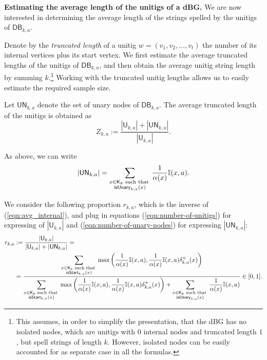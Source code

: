 \documentclass[a4paper,11pt]{article}
\newcommand{\DB}{\mathsf{DB}_{k,a}}
\newcommand{\U}{\mathsf{U}_{k,a}}
\newcommand{\UN}{\mathsf{UN}_{k,a}}
\newcommand{\dplus}{\delta^+_{k,a}}
\newcommand{\K}{\mathsf{K}}
\newcommand{\abu}{\alpha}
\newcommand{\isstart}{{\sf isStart}_{k,a}}
\newcommand{\isunary}{{\sf isUnary}_{k,a}}
\begin{document}
\medskip
\noindent\textbf{Estimating the average length of the unitigs of a dBG.} We are now interested in determining the average length of the strings spelled by the unitigs of $\DB$. 

Denote by the \emph{truncated length} of a unitig $w = (v_1,v_2,\dots,v_t)$ the number of its internal vertices plus its start vertex. We first estimate the average truncated lengths of the unitigs of $\DB$, and then obtain the average unitig string length by summing $k$.\footnote{This assumes, in order to simplify the presentation, that the dBG has no isolated nodes, which are unitigs with $0$ internal nodes and truncated length $1$, but spell strings of length $k$. However, isolated nodes can be easily accounted for as separate case in all the formulas.} Working with the truncated unitig lengths allows us to easily estimate the required sample size.

Let $\UN$ denote the set of unary nodes of $\DB$. The average truncated length of the unitigs is obtained as 
\begin{equation}
 Z_{k,a} := \frac{|\U| + |\UN|}{|\U|}.
\label{eqn:avg_internal}
\end{equation}

As above, we can write
\begin{equation}
|\UN| = \sum_{\begin{subarray}{c} x \in \K_k \text{ such that } \\ \isunary(x) \end{subarray}} \frac{1}{\abu(x)}\mathbb{I}(x,a).
\label{eqn:number-of-unary-nodes}
\end{equation}

We consider the following proportion $r_{k,a}$, which is the inverse of (\ref{eqn:avg_internal}), and plug in equations (\ref{eqn:number-of-unitigs}) for expressing of $|\U|$ and (\ref{eqn:number-of-unary-nodes}) for expressing $|\UN|$:
\begin{align*}
r_{k,a} & := \frac{|\U|}{|\U| + |\UN|} = \\ 
& = \frac{\displaystyle\sum_{\begin{subarray}{c} x \in \K_k \text{ such that }\\ \isstart(x) \end{subarray}} \max\left(\frac{1}{\abu(x)}\mathbb{I}(x,a),\frac{1}{\abu(x)}\mathbb{I}(x,a)\dplus(x)\right)}{\displaystyle\sum_{\begin{subarray}{c} x \in \K_k \text{ such that }\\ \isstart(x) \end{subarray}} \max\left(\frac{1}{\abu(x)}\mathbb{I}(x,a),\frac{1}{\abu(x)}\mathbb{I}(x,a)\dplus(x)\right) + \sum_{\begin{subarray}{c} x \in \K_k \text{ such that } \\ \isunary(x)  \end{subarray}} \frac{1}{\abu(x)}\mathbb{I}(x,a)}\in [0,1].\\
\end{align*}
\end{document}
